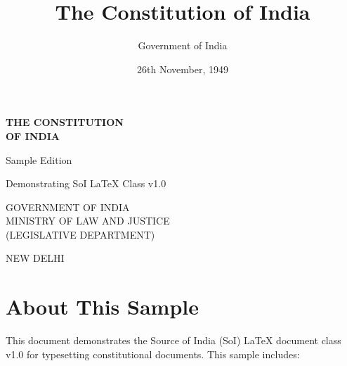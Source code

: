 \documentclass[a4paper,12pt,showamendments]{soi}
\title{The Constitution of India}
\author{Government of India}
\date{26th November, 1949}
\begin{document}

\begin{titlepage}
    \centering
    \vspace*{2cm}
    
    {\Huge\bfseries THE CONSTITUTION\\[0.5cm]OF INDIA}
    
    \vspace{2cm}
    
    {\Large Sample Edition}
    
    \vspace{1cm}
    
    {\large Demonstrating SoI LaTeX Class v1.0}
    
    \vspace{3cm}
    
    
    \vfill
    
    {\large GOVERNMENT OF INDIA\\
    MINISTRY OF LAW AND JUSTICE\\
    (LEGISLATIVE DEPARTMENT)}
    
    \vspace{1cm}
    
    {\large NEW DELHI}
\end{titlepage}

\tableofcontents
\clearpage


\clearpage








\clearpage
\appendix



\clearpage
\section*{About This Sample}
This document demonstrates the Source of India (SoI) LaTeX document class v1.0 for typesetting constitutional documents. This sample includes:
\end{document}
